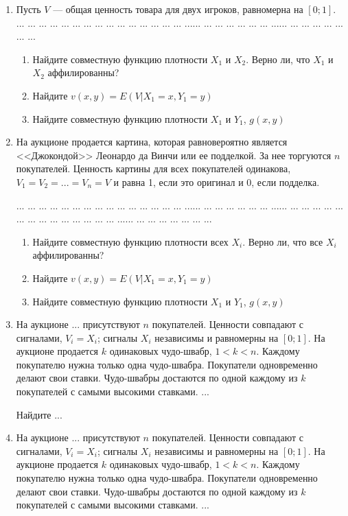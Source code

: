 \documentclass[pdftex,12pt,a4paper]{article}
\begin{document}
\begin{enumerate}


\item Пусть $  V $ --- общая ценность товара для двух игроков, равномерна на $ [0;1] $. ... ... ... ... ... ... ... ... ... ... ... ... ... ... ... ...... ... ... ... ... ... ... ...... ... ... ... ... ... ... ...

\begin{enumerate}
\item Найдите совместную функцию плотности $ X_{1} $ и $ X_{2} $. Верно ли, что $ X_{1} $ и $ X_{2} $ аффилированны?
\item Найдите $ v(x,y)=E(V|X_{1}=x,Y_{1}=y) $ 
\item Найдите совместную функцию плотности $ X_{1} $ и $ Y_{1} $, $ g(x,y) $
\end{enumerate}


\item На аукционе продается картина, которая равновероятно является <<Джокондой>> Леонардо да Винчи или ее подделкой. За нее торгуются $ n $ покупателей. Ценность картины для всех покупателей одинакова, $ V_{1}=V_{2}=...=V_{n}=V $ и равна 1, если это оригинал и 0, если подделка.

... ... ... ... ... ... ... ... ... ... ... ... ... ... ... ...... ... ... ... ... ... ... ...... ... ... ... ... ... ... ...
... ... ... ... ... ... ... ...... ... ... ... ... ... ... ...
\begin{enumerate}
\item Найдите совместную функцию плотности всех $ X_{i} $. Верно ли, что все $ X_{i} $ аффилированны?
\item Найдите $ v(x,y)=E(V|X_{1}=x,Y_{1}=y) $
\item Найдите совместную функцию плотности $ X_{1} $ и $ Y_{1} $, $ g(x,y) $
\end{enumerate}

\item На аукционе ... присутствуют $ n $ покупателей. Ценности совпадают с сигналами, $ V_{i}=X_{i} $; сигналы $ X_{i} $ независимы и равномерны на $ [0;1] $. На аукционе продается $k$ одинаковых чудо-швабр, $ 1<k<n $. Каждому покупателю нужна только одна чудо-швабра. Покупатели одновременно делают свои ставки. Чудо-швабры достаются по одной каждому из $ k $ покупателей с самыми высокими ставками. ...

Найдите ...


\item На аукционе ... присутствуют $ n $ покупателей. Ценности совпадают с сигналами, $ V_{i}=X_{i} $; сигналы $ X_{i} $ независимы и равномерны на $ [0;1] $. На аукционе продается $k$ одинаковых чудо-швабр, $ 1<k<n $. Каждому покупателю нужна только одна чудо-швабра. Покупатели одновременно делают свои ставки. Чудо-швабры достаются по одной каждому из $ k $ покупателей с самыми высокими ставками. ...


\end{enumerate}
\end{document}
